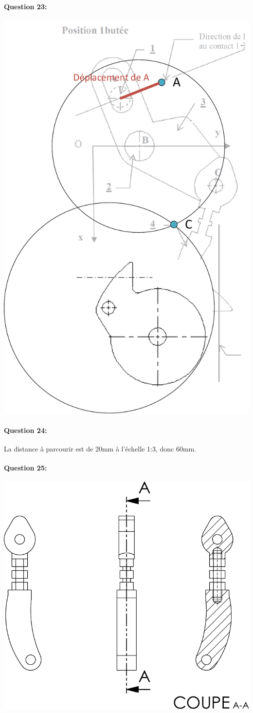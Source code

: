 \newpage

\paragraph{Question 23:}

\begin{center}
 \includegraphics[width=0.7\linewidth]{img/geometrie}
\end{center}

\paragraph{Question 24:}

La distance à parcourir est de 20mm à l'échelle 1:3, donc 60mm.

\newpage

\paragraph{Question 25:}

\begin{center}
 \includegraphics[width=0.6\linewidth]{img/Piece_cor}
\end{center}


